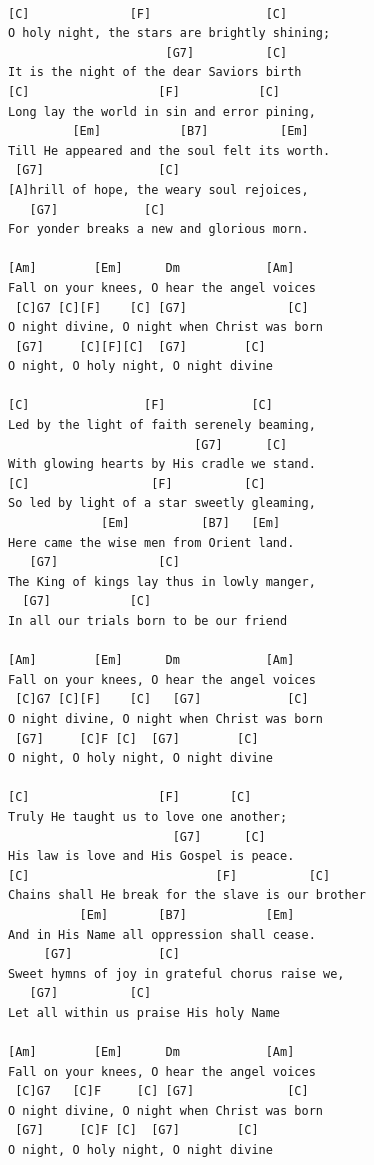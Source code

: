 \documentclass[
]{book}
\begin{document}
\begin{verbatim}

[C]              [F]                [C]
O holy night, the stars are brightly shining;
                      [G7]          [C]
It is the night of the dear Saviors birth
[C]                  [F]           [C]
Long lay the world in sin and error pining,
         [Em]           [B7]          [Em]
Till He appeared and the soul felt its worth.
 [G7]                [C]           
[A]hrill of hope, the weary soul rejoices,
   [G7]            [C]               
For yonder breaks a new and glorious morn.

[Am]        [Em]      Dm            [Am]
Fall on your knees, O hear the angel voices
 [C]G7 [C][F]    [C] [G7]              [C]
O night divine, O night when Christ was born
 [G7]     [C][F][C]  [G7]        [C]
O night, O holy night, O night divine

[C]                [F]            [C]
Led by the light of faith serenely beaming,
                          [G7]      [C]
With glowing hearts by His cradle we stand.
[C]                 [F]          [C]
So led by light of a star sweetly gleaming,
             [Em]          [B7]   [Em]
Here came the wise men from Orient land.
   [G7]              [C]
The King of kings lay thus in lowly manger,
  [G7]           [C]
In all our trials born to be our friend

[Am]        [Em]      Dm            [Am]
Fall on your knees, O hear the angel voices
 [C]G7 [C][F]    [C]   [G7]            [C]
O night divine, O night when Christ was born
 [G7]     [C]F [C]  [G7]        [C]
O night, O holy night, O night divine

[C]                  [F]       [C]
Truly He taught us to love one another;
                       [G7]      [C]
His law is love and His Gospel is peace.
[C]                          [F]          [C]
Chains shall He break for the slave is our brother
          [Em]       [B7]           [Em]
And in His Name all oppression shall cease.
     [G7]            [C]
Sweet hymns of joy in grateful chorus raise we,
   [G7]          [C]
Let all within us praise His holy Name

[Am]        [Em]      Dm            [Am]
Fall on your knees, O hear the angel voices
 [C]G7   [C]F     [C] [G7]             [C]
O night divine, O night when Christ was born
 [G7]     [C]F [C]  [G7]        [C]
O night, O holy night, O night divine


\end{verbatim}
\end{document}
